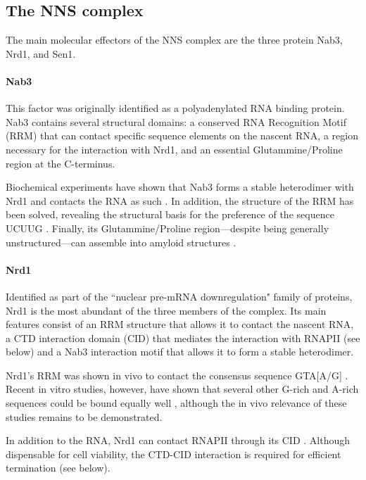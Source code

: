 \subsection{The NNS complex}

The main molecular effectors of the NNS complex are the three protein Nab3, Nrd1, and Sen1.


\paragraph{Nab3}

This factor was originally identified as a polyadenylated RNA binding protein. 
Nab3 contains several structural domains: a conserved RNA Recognition Motif (RRM) that can contact specific sequence elements on the nascent RNA, a region necessary for the interaction with Nrd1, and an essential Glutammine/Proline region at the C-terminus.

Biochemical experiments have shown that Nab3 forms a stable heterodimer with Nrd1 and contacts the RNA as such \cite{conrad:2000:yeast}. 
In addition, the structure of the RRM has been solved, revealing the structural basis for the preference of the sequence UCUUG \cite{lunde:2011:structural}. 
Finally, its Glutammine/Proline region---despite being generally unstructured---can assemble into amyloid structures \cite{orourke:2015:amyloidlike}.


\paragraph{Nrd1}

Identified as part of the ``nuclear pre-mRNA downregulation" family of proteins, Nrd1 is the most abundant of the three members of the complex. 
Its main features consist of an RRM structure that allows it to contact the nascent RNA, a CTD interaction domain (CID) that mediates the interaction with RNAPII (see below) and a Nab3 interaction motif that allows it to form a stable heterodimer.

Nrd1's RRM was shown in vivo to contact the consensus sequence GTA[A/G] \cite{steinmetz:1998:control}. 
Recent in vitro studies, however, have shown that several other G-rich and A-rich sequences could be bound equally well \citep{bacikova:2014:structure}, although the in vivo relevance of these studies remains to be demonstrated. 

In addition to the RNA, Nrd1 can contact RNAPII through its CID \cite{kubicek:2012:serine,vasiljeva:2008:nrd1nab3sen1}. 
Although dispensable for cell viability, the CTD-CID interaction is required for efficient termination (see below).

